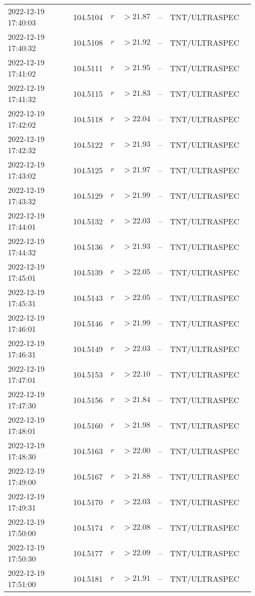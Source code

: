 \documentclass{nature_plusfigure}
\begin{document}
\begin{supplement}
\begin{center}
\begin{longtable}{lllllll}
2022-12-19 17:40:03 & 104.5104 & $r$ & $>21.87$ & -- & TNT/ULTRASPEC &  \\ 
2022-12-19 17:40:32 & 104.5108 & $r$ & $>21.92$ & -- & TNT/ULTRASPEC &  \\ 
2022-12-19 17:41:02 & 104.5111 & $r$ & $>21.95$ & -- & TNT/ULTRASPEC &  \\ 
2022-12-19 17:41:32 & 104.5115 & $r$ & $>21.83$ & -- & TNT/ULTRASPEC &  \\ 
2022-12-19 17:42:02 & 104.5118 & $r$ & $>22.04$ & -- & TNT/ULTRASPEC &  \\ 
2022-12-19 17:42:32 & 104.5122 & $r$ & $>21.93$ & -- & TNT/ULTRASPEC &  \\ 
2022-12-19 17:43:02 & 104.5125 & $r$ & $>21.97$ & -- & TNT/ULTRASPEC &  \\ 
2022-12-19 17:43:32 & 104.5129 & $r$ & $>21.99$ & -- & TNT/ULTRASPEC &  \\ 
2022-12-19 17:44:01 & 104.5132 & $r$ & $>22.03$ & -- & TNT/ULTRASPEC &  \\ 
2022-12-19 17:44:32 & 104.5136 & $r$ & $>21.93$ & -- & TNT/ULTRASPEC &  \\ 
2022-12-19 17:45:01 & 104.5139 & $r$ & $>22.05$ & -- & TNT/ULTRASPEC &  \\ 
2022-12-19 17:45:31 & 104.5143 & $r$ & $>22.05$ & -- & TNT/ULTRASPEC &  \\ 
2022-12-19 17:46:01 & 104.5146 & $r$ & $>21.99$ & -- & TNT/ULTRASPEC &  \\ 
2022-12-19 17:46:31 & 104.5149 & $r$ & $>22.03$ & -- & TNT/ULTRASPEC &  \\ 
2022-12-19 17:47:01 & 104.5153 & $r$ & $>22.10$ & -- & TNT/ULTRASPEC &  \\ 
2022-12-19 17:47:30 & 104.5156 & $r$ & $>21.84$ & -- & TNT/ULTRASPEC &  \\ 
2022-12-19 17:48:01 & 104.5160 & $r$ & $>21.98$ & -- & TNT/ULTRASPEC &  \\ 
2022-12-19 17:48:30 & 104.5163 & $r$ & $>22.00$ & -- & TNT/ULTRASPEC &  \\ 
2022-12-19 17:49:00 & 104.5167 & $r$ & $>21.88$ & -- & TNT/ULTRASPEC &  \\ 
2022-12-19 17:49:31 & 104.5170 & $r$ & $>22.03$ & -- & TNT/ULTRASPEC &  \\ 
2022-12-19 17:50:00 & 104.5174 & $r$ & $>22.08$ & -- & TNT/ULTRASPEC &  \\ 
2022-12-19 17:50:30 & 104.5177 & $r$ & $>22.09$ & -- & TNT/ULTRASPEC &  \\ 
2022-12-19 17:51:00 & 104.5181 & $r$ & $>21.91$ & -- & TNT/ULTRASPEC &  \\ 

\end{longtable}
\end{center}
\end{supplement}
\end{document}
